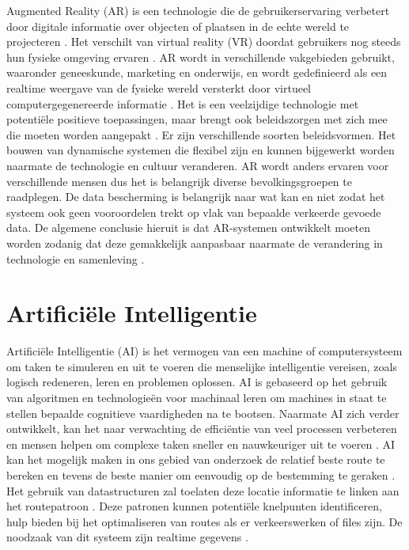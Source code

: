 Augmented Reality (AR) is een technologie die de gebruikerservaring verbetert door digitale informatie over objecten of plaatsen in de echte wereld te projecteren \autocite{Berryman2012}. Het verschilt van virtual reality (VR) doordat gebruikers nog steeds hun fysieke omgeving ervaren \autocite{Calo2015}. AR wordt in verschillende vakgebieden gebruikt, waaronder geneeskunde, marketing en onderwijs, en wordt gedefinieerd als een realtime weergave van de fysieke wereld versterkt door virtueel computergegenereerde informatie \autocite{Carmigniani2011}. Het is een veelzijdige technologie met potentiële positieve toepassingen, maar brengt ook beleidszorgen met zich mee die moeten worden aangepakt \autocite{Calo2015}. Er zijn verschillende soorten beleidsvormen. Het bouwen van dynamische systemen die flexibel zijn en kunnen bijgewerkt worden naarmate de technologie en cultuur veranderen. AR wordt anders ervaren voor verschillende mensen dus het is belangrijk diverse bevolkingsgroepen te raadplegen. De data bescherming is belangrijk naar wat kan en niet zodat het systeem ook geen vooroordelen trekt op vlak van bepaalde verkeerde gevoede data. De algemene conclusie hieruit is dat AR-systemen ontwikkelt moeten worden zodanig dat deze gemakkelijk aanpasbaar naarmate de verandering in technologie en samenleving \autocite{Calo2015}.


\section{Artificiële Intelligentie}
\label{sec:artificiele-intelligentie}

Artificiële Intelligentie (AI) is het vermogen van een machine of computersysteem om taken te simuleren en uit te voeren die menselijke intelligentie vereisen, zoals logisch redeneren, leren en problemen oplossen. AI is gebaseerd op het gebruik van algoritmen en technologieën voor machinaal leren om machines in staat te stellen bepaalde cognitieve vaardigheden na te bootsen. Naarmate AI zich verder ontwikkelt, kan het naar verwachting de efficiëntie van veel processen verbeteren en mensen helpen om complexe taken sneller en nauwkeuriger uit te voeren \autocite{Sabouret2020}. AI kan het mogelijk maken in ons gebied van onderzoek de relatief beste route te bereken en tevens de beste manier om eenvoudig op de bestemming te geraken \autocite{Soni2023a}. Het gebruik van datastructuren zal toelaten deze locatie informatie te linken aan het routepatroon \autocite{Ruta2010}. Deze patronen kunnen potentiële knelpunten identificeren, hulp bieden bij het optimaliseren van routes als er verkeerswerken of files zijn. De noodzaak van dit systeem zijn realtime gegevens \autocite{Ciravegna2018}.

